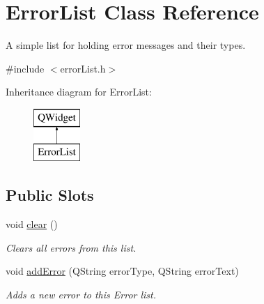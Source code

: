 \hypertarget{class_error_list}{\section{Error\-List Class Reference}
\label{class_error_list}
}


A simple list for holding error messages and their types.  




{\ttfamily \#include $<$error\-List.\-h$>$}

Inheritance diagram for Error\-List\-:\begin{figure}[H]
\begin{center}
\leavevmode
\includegraphics[height=2.000000cm]{class_error_list}
\end{center}
\end{figure}
\subsection*{Public Slots}
\begin{DoxyCompactItemize}
\item 
\hypertarget{class_error_list_a525741e6e6ae8c20af823e6b9ce8185c}{void \hyperlink{class_error_list_a525741e6e6ae8c20af823e6b9ce8185c}{clear} ()}\label{class_error_list_a525741e6e6ae8c20af823e6b9ce8185c}

\begin{DoxyCompactList}\small\item\em Clears all errors from this list. \end{DoxyCompactList}\item 
void \hyperlink{class_error_list_a0d7142914d8cf6d4770af60ad9a5855f}{add\-Error} (Q\-String error\-Type, Q\-String error\-Text)
\begin{DoxyCompactList}\small\item\em Adds a new error to this Error list. \end{DoxyCompactList}\end{DoxyCompactItemize}
